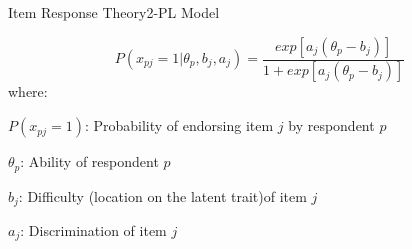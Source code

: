\documentclass{beamer} %
\begin{document}
\begin{frame}{Item Response Theory}{2-PL Model}

				\begin{equation*}\label{eq:2pl}
				P(x_{pj} = 1|\theta_p, b_j, a_j) = \frac{exp[a_j(\theta_p - b_j)]}{1 + exp[a_j(\theta_p - b_j)]}
			\end{equation*}
		\vspace{3mm}
			where: 
		
			$P(x_{pj} = 1)$: Probability of  endorsing item $j$ by respondent $p$
			
				\vspace{1.5mm}
				
			$\theta_p$: Ability of respondent $p$
			
				\vspace{1.5mm}
			$b_j$: Difficulty \small(location on the latent trait)\normalsize of item $j$
			
				\vspace{1.5mm}
			$a_j$: Discrimination of item $j$



\end{frame}
\end{document}
